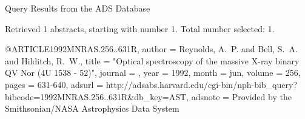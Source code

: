 Query Results from the ADS Database


Retrieved 1 abstracts, starting with number 1.  Total number selected: 1.

@ARTICLE{1992MNRAS.256..631R,
   author = {{Reynolds}, A.~P. and {Bell}, S.~A. and {Hilditch}, R.~W.},
    title = "{Optical spectroscopy of the massive X-ray binary QV Nor (4U 1538 - 52)}",
  journal = {\mnras},
     year = 1992,
    month = jun,
   volume = 256,
    pages = {631-640},
   adsurl = {http://adsabs.harvard.edu/cgi-bin/nph-bib_query?bibcode=1992MNRAS.256..631R&db_key=AST},
  adsnote = {Provided by the Smithsonian/NASA Astrophysics Data System}
}


